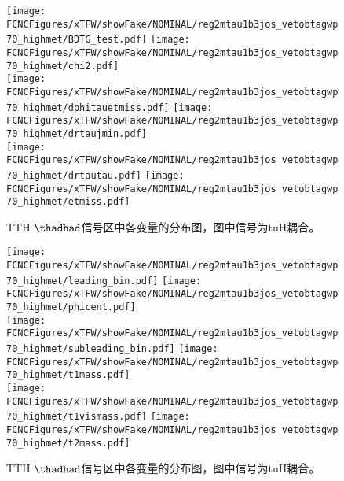 \begin{figure}[H]
\centering
\texttt{[image: \\FCNCFigures/xTFW/showFake/NOMINAL/reg2mtau1b3jos\_vetobtagwp70\_highmet/BDTG\_test.pdf]}
\texttt{[image: \\FCNCFigures/xTFW/showFake/NOMINAL/reg2mtau1b3jos\_vetobtagwp70\_highmet/chi2.pdf]}
\\
\texttt{[image: \\FCNCFigures/xTFW/showFake/NOMINAL/reg2mtau1b3jos\_vetobtagwp70\_highmet/dphitauetmiss.pdf]}
\texttt{[image: \\FCNCFigures/xTFW/showFake/NOMINAL/reg2mtau1b3jos\_vetobtagwp70\_highmet/drtaujmin.pdf]}
\\
\texttt{[image: \\FCNCFigures/xTFW/showFake/NOMINAL/reg2mtau1b3jos\_vetobtagwp70\_highmet/drtautau.pdf]}
\texttt{[image: \\FCNCFigures/xTFW/showFake/NOMINAL/reg2mtau1b3jos\_vetobtagwp70\_highmet/etmiss.pdf]}
\\
\caption{TTH $\thadhad$信号区中各变量的分布图，图中信号为tuH耦合。}
\label{fig:var_reg2mtau1b3jos_vetobtagwp70_highmet_0}
\end{figure}
\begin{figure}[H]
\centering
\texttt{[image: \\FCNCFigures/xTFW/showFake/NOMINAL/reg2mtau1b3jos\_vetobtagwp70\_highmet/leading\_bin.pdf]}
\texttt{[image: \\FCNCFigures/xTFW/showFake/NOMINAL/reg2mtau1b3jos\_vetobtagwp70\_highmet/phicent.pdf]}
\\
\texttt{[image: \\FCNCFigures/xTFW/showFake/NOMINAL/reg2mtau1b3jos\_vetobtagwp70\_highmet/subleading\_bin.pdf]}
\texttt{[image: \\FCNCFigures/xTFW/showFake/NOMINAL/reg2mtau1b3jos\_vetobtagwp70\_highmet/t1mass.pdf]}
\\
\texttt{[image: \\FCNCFigures/xTFW/showFake/NOMINAL/reg2mtau1b3jos\_vetobtagwp70\_highmet/t1vismass.pdf]}
\texttt{[image: \\FCNCFigures/xTFW/showFake/NOMINAL/reg2mtau1b3jos\_vetobtagwp70\_highmet/t2mass.pdf]}
\\
\caption{TTH $\thadhad$信号区中各变量的分布图，图中信号为tuH耦合。}
\label{fig:var_reg2mtau1b3jos_vetobtagwp70_highmet_1}
\end{figure}
